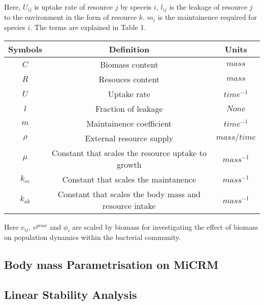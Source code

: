 \documentclass{article}
\begin{document}
 Here, $U_{ij}$ is uptake rate of resource $j$ by speceis $i$, $l_{ij}$ is the leakage of resource $j$ to the environment in the form of resource $k$. $m_i$ is the maintainence required for species $i$. The terms are explained in Table 1. 

 \begin{center}
    \begin{tabular}{ |c|c|c| } 
     \hline
     Symbols & Definition & Units \\

     \hline 
     $C$ & Biomass content & $mass$ \\ 
     $R$ & Resouces content & $mass$ \\
     $U$ & Uptake rate & $time^{-1}$ \\
     $l$ & Fraction of leakage & $None$ \\
     $m$ & Maintainence coefficient & $time^{-1}$ \\
     $\rho$ & External resource supply & $mass/time$ \\
     $\mu$ &  Constant that scales the resource uptake to growth & $mass^{-1}$ \\
     $k_m$ & Constant that scales the maintanence & $mass^{-1}$ \\
     $k_{ab}$ & Constant that scales the body mass and resource intake & $mass^{-1}$ \\
     \hline

    \end{tabular}
    \end{center}

Here $v_{ij}$, $v^{grow}$ and $\phi_i$ are scaled by biomass for investigating the effect of biomass on population dynamics within the bacterial community. 

\subsection{Body mass Parametrisation on MiCRM}

\subsection{Linear Stability Analysis}
\end{document}
